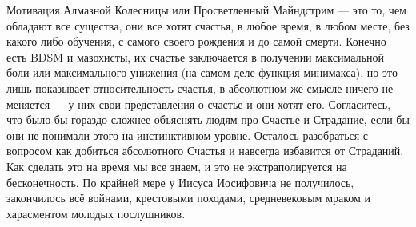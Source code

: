 Мотивация Алмазной Колесницы или Просветленный Майндстрим — это то, чем обладают все существа, они все хотят счастья, в любое время, в любом месте, без какого либо обучения, с самого своего рождения и до самой смерти. Конечно есть BDSM и мазохисты, их счастье заключается в получении максимальной боли или максимального унижения (на самом деле функция минимакса), но это лишь показывает относительность счастья, в абсолютном же смысле ничего не меняется — у них свои представления о счастье и они хотят его. Согласитесь, что было бы гораздо сложнее объяснять людям про Счастье и Страдание, если бы они не понимали этого на инстинктивном уровне. Осталось разобраться с вопросом как добиться абсолютного Счастья и навсегда избавится от Страданий. Как сделать это на время мы все знаем, и это не экстраполируется на бесконечность. По крайней мере у Иисуса Иосифовича не получилось, закончилось всё войнами, крестовыми походами, средневековым мраком и харасментом молодых послушников.

